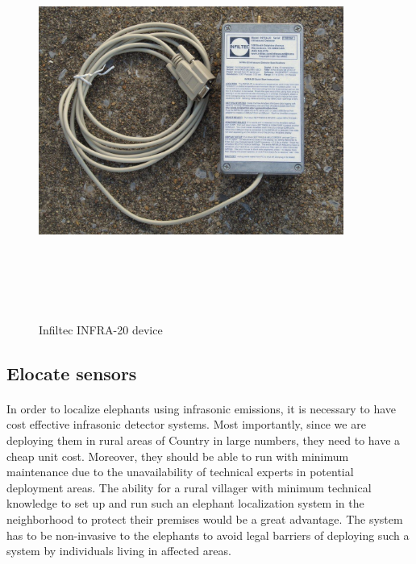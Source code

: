 \documentclass[12pt]{article}
\numberwithin{figure}{section}
\numberwithin{table}{section}
\begin{document}
\begin{figure}[H]
\centering
\includegraphics[width=10cm,height=13cm,keepaspectratio]{INFRA_20.jpg}
\caption{Infiltec INFRA-20 device}
\label{d:p12}
\end{figure}


\newpage
\subsection{Elocate sensors}

\paragraph{}
In order to localize elephants using infrasonic emissions, it is necessary to have cost effective infrasonic detector systems. Most importantly, since we are deploying them in rural areas of Country in large numbers, they need to have a cheap unit cost. Moreover, they should be able to run with minimum maintenance due to the unavailability of technical experts in potential deployment areas. The ability for a rural villager with minimum technical knowledge to set up and run such an elephant localization system in the neighborhood to protect their premises would be a great advantage. The system has to be non-invasive to the elephants to avoid legal barriers of deploying such a system by individuals living in affected areas.
\end{document}
